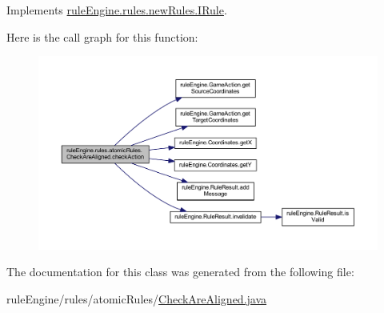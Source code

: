 Implements \mbox{\hyperlink{interfacerule_engine_1_1rules_1_1new_rules_1_1_i_rule_a72ce29a47d7a5fba75a09444a50a481e}{rule\+Engine.\+rules.\+new\+Rules.\+I\+Rule}}.

Here is the call graph for this function\+:
\nopagebreak
\begin{figure}[H]
\begin{center}
\leavevmode
\includegraphics[width=350pt]{classrule_engine_1_1rules_1_1atomic_rules_1_1_check_are_aligned_a04fe3215ef18fd621e84918682342354_cgraph}
\end{center}
\end{figure}


The documentation for this class was generated from the following file\+:\begin{DoxyCompactItemize}
\item 
rule\+Engine/rules/atomic\+Rules/\mbox{\hyperlink{_check_are_aligned_8java}{Check\+Are\+Aligned.\+java}}\end{DoxyCompactItemize}
